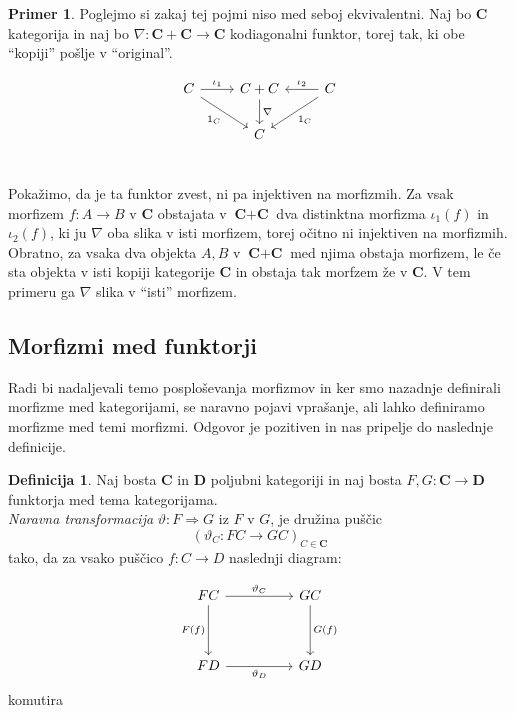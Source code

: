 \documentclass[12pt,a4paper]{book}
\theoremstyle{definition}
\newtheorem{definicija}{Definicija}[chapter]
\theoremstyle{plain}
\theoremstyle{definition}
\newtheorem{primer}{Primer}[section]
\theoremstyle{remark}
\newcommand{\cat}[1]{\textbf{#1}}
\begin{document}
\begin{primer}
Poglejmo si zakaj tej pojmi niso med seboj ekvivalentni. Naj bo $\cat{C}$ kategorija in naj bo $\nabla : \cat{C} + \cat{C} \to \cat{C}$ kodiagonalni funktor, torej tak, ki obe "`kopiji"' pošlje v "`original"'.

$$\begin{tikzcd}[column sep=normal]
C \ar[r, "\iota_1"] \ar[dr, "1_C"'] & C + C \ar[d, "\nabla"] & C \ar[l, "\iota_2"'] \ar[dl, "1_C"] \\
& C & \\
\end{tikzcd}$$

Pokažimo, da je ta funktor zvest, ni pa injektiven na morfizmih. 
Za vsak morfizem $f : A \to B$ v $\cat{C}$ obstajata v $\cat{C} + \cat{C}$ dva distinktna morfizma $\iota_1(f)$ in $\iota_2(f)$, ki ju $\nabla$ oba slika v isti morfizem, torej očitno ni injektiven na morfizmih. Obratno, za vsaka dva objekta $A,B$ v $\cat{C} + \cat{C}$ med njima obstaja morfizem, le če sta objekta v isti kopiji kategorije $\cat{C}$ in obstaja tak morfzem že v $\cat{C}$. V tem primeru ga $\nabla$ slika v "`isti"' morfizem.

\end{primer}

\subsection{Morfizmi med funktorji}
Radi bi nadaljevali temo posploševanja morfizmov in ker smo nazadnje definirali morfizme med kategorijami, se naravno pojavi vprašanje, ali lahko definiramo morfizme med temi morfizmi. Odgovor je pozitiven in nas pripelje do naslednje definicije.

\begin{definicija}
Naj bosta $\cat{C}$ in $\cat{D}$ poljubni kategoriji in naj bosta $F,G : \cat{C} \to \cat{D}$ funktorja med tema kategorijama. \\
\textit{Naravna transformacija} $\vartheta : F \Rightarrow G$ iz $F$ v $G$, je družina puščic 
$$(\vartheta_C : FC \to GC)_{C \in \cat{C}}$$
tako, da za vsako puščico $f : C \to D$ naslednji diagram:

\begin{equation}
\begin{tikzcd}[sep=huge]
FC \arrow[r, "\vartheta_C"] \arrow[d, "F(f)"'] & GC \arrow[d, "G(f)"] \\
FD \arrow[r, "\vartheta_D"'] & GD
\end{tikzcd}
\end{equation}
komutira
\end{definicija}
\end{document}
